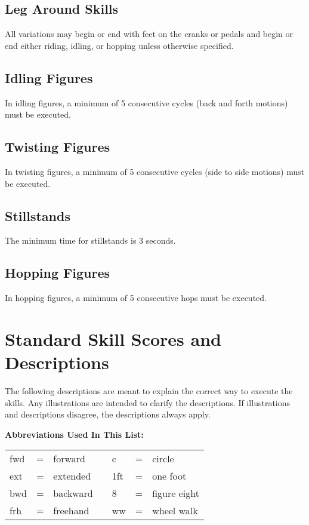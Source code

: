 \subsection{Leg Around Skills}
All variations may begin or end with feet on the cranks or pedals and begin or end either riding, idling, or hopping unless otherwise specified.

\subsection{Idling Figures}
In idling figures, a minimum of 5 consecutive cycles (back and forth motions) must be executed.

\subsection{Twisting Figures}
In twisting figures, a minimum of 5 consecutive cycles (side to side motions) must be executed.

\subsection{Stillstands}
The minimum time for stillstands is 3 seconds.

\subsection{Hopping Figures}
In hopping figures, a minimum of 5 consecutive hops must be executed.

\section{Standard Skill Scores and Descriptions}
The following descriptions are meant to explain the correct way to execute the skills.
Any illustrations are intended to clarify the descriptions.
If illustrations and descriptions disagree, the descriptions always apply.

\textbf{Abbreviations Used In This List:}
\begin{center}
\begin{tabular}{l l l p{2cm} l l l}
fwd & = & forward & & c & = & circle \\
ext & = & extended & & 1ft & = & one foot \\
bwd & = & backward & & 8 & = & figure eight \\
frh & = & freehand & & ww & = & wheel walk \\
\end{tabular}
\end{center}


